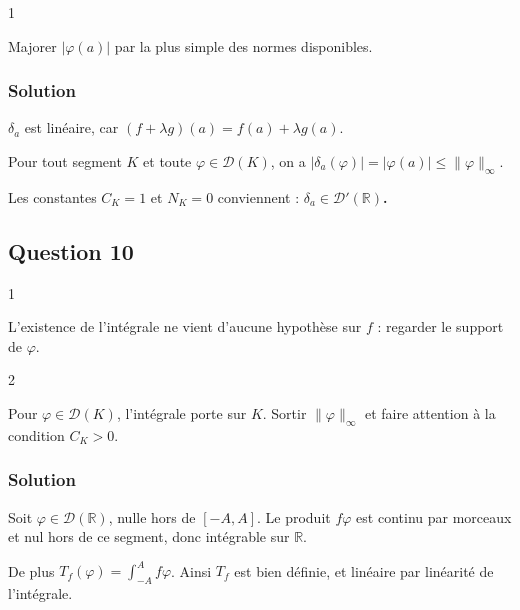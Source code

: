 \documentclass[11pt,a4paper]{article}
\begin{document}
\begin{indication}{1}

Majorer \(|\varphi(a)|\) par la plus simple des normes disponibles.

\end{indication}

\hypertarget{solution-8}{%
\subsubsection{Solution}\label{solution-8}}

\(\delta_a\) est linéaire, car \((f+\lambda g)(a)=f(a)+\lambda g(a)\).

Pour tout segment \(K\) et toute \(\varphi\in\mathcal D(K)\), on a \(|\delta_a(\varphi)|=|\varphi(a)|\leqslant\|\varphi\|_\infty\).

Les constantes \(C_K=1\) et \(N_K=0\) conviennent : \textbf{\(\delta_a\in\mathcal D'(\mathbb R)\).}

\hypertarget{question-10}{%
\subsection{Question 10}\label{question-10}}

\begin{indication}{1}

L'existence de l'intégrale ne vient d'aucune hypothèse sur \(f\) : regarder le support de \(\varphi\).

\end{indication}

\begin{indication}{2}

Pour \(\varphi\in\mathcal D(K)\), l'intégrale porte sur \(K\). Sortir \(\|\varphi\|_\infty\) et faire attention à la condition \(C_K>0\).

\end{indication}

\hypertarget{solution-9}{%
\subsubsection{Solution}\label{solution-9}}

Soit \(\varphi\in\mathcal D(\mathbb R)\), nulle hors de \([-A,A]\). Le produit \(f\varphi\) est continu par morceaux et nul hors de ce segment, donc intégrable sur \(\mathbb R\).

De plus \(T_f(\varphi)=\int_{-A}^Af\varphi\). Ainsi \(T_f\) est bien définie, et linéaire par linéarité de l'intégrale.
\end{document}
